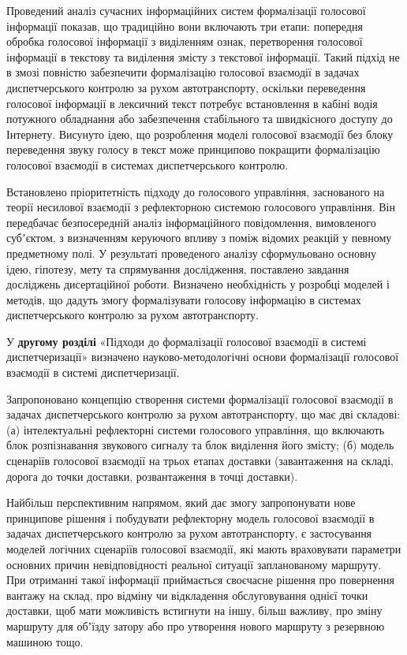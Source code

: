 Проведений аналіз сучасних інформаційних систем формалізації голосової інформації показав, що традиційно вони включають три етапи: попередня обробка голосової інформації з виділенням ознак, перетворення голосової інформації в текстову та виділення змісту з текстової інформації. Такий підхід не в змозі повністю забезпечити формалізацію голосової взаємодії в задачах диспетчерського контролю за рухом автотранспорту, оскільки переведення голосової інформації в лексичний текст потребує встановлення в кабіні водія потужного обладнання або забезпечення стабільного та швидкісного доступу до Інтернету. Висунуто ідею, що розроблення моделі голосової взаємодії без блоку переведення звуку голосу в текст може принципово покращити формалізацію голосової взаємодії в системах диспетчерського контролю.

Встановлено пріоритетність підходу до голосового управління, заснованого на теорії несилової взаємодії з рефлекторною системою голосового управління. Він передбачає безпосередній аналіз інформаційного повідомлення, вимовленого субʼєктом, з визначенням керуючого впливу з поміж відомих реакцій у певному предметному полі.
У результаті проведеного аналізу сформульовано основну ідею, гіпотезу, мету та спрямування дослідження, поставлено завдання досліджень дисертаційної роботи. Визначено необхідність у розробці моделей і методів, що дадуть змогу формалізувати голосову інформацію в системах диспетчерського контролю за рухом автотранспорту.

У \textbf{другому розділі} «Підходи до формалізації голосової взаємодії в системі диспетчеризації» визначено науково-методологічні основи формалізації голосової взаємодії в системі диспетчеризації. 

Запропоновано концепцію створення системи формалізації голосової взаємодії в задачах диспетчерського контролю за рухом автотранспорту, що має дві складові: (а) інтелектуальні рефлекторні системи голосового управління, що включають блок розпізнавання звукового сигналу та блок виділення його змісту; (б) модель сценаріїв голосової взаємодії на трьох етапах доставки (завантаження на складі, дорога до точки доставки, розвантаження в точці доставки).

Найбільш перспективним напрямом, який дає змогу запропонувати нове принципове рішення і побудувати рефлекторну модель голосової взаємодії в задачах диспетчерського контролю за рухом автотранспорту, є застосування моделей логічних сценаріїв голосової взаємодії, які мають враховувати параметри основних причин невідповідності реальної ситуації запланованому маршруту. При отриманні такої інформації приймається своєчасне рішення про повернення вантажу на склад, про відміну чи відкладення обслуговування однієї точки доставки, щоб мати можливість встигнути на іншу, більш важливу, про зміну маршруту для обʼїзду затору або про утворення нового маршруту з резервною машиною тощо.

